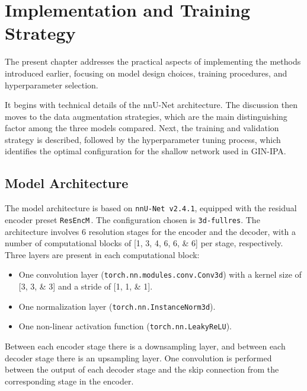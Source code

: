 \chapter{Implementation and Training Strategy} \label{chap:ImplementationAndTrainingStrategy}
\vspace{1cm}

The present chapter addresses the practical aspects of implementing the methods introduced earlier, focusing on model design choices, training procedures, and hyperparameter selection.

It begins with technical details of the nnU-Net architecture. The discussion then moves to the data augmentation strategies, which are the main distinguishing factor among the three models compared. Next, the training and validation strategy is described, followed by the hyperparameter tuning process, which identifies the optimal configuration for the shallow network used in GIN-IPA.

\section{Model Architecture} \label{sec:ModelArchitecture}
The model architecture is based on \texttt{nnU-Net v2.4.1}, equipped with the residual encoder preset \texttt{ResEncM}\,\cite{Isensee2024}. The configuration chosen is \texttt{3d-fullres}. The architecture involves \num{6} resolution stages for the encoder and the decoder, with a number of computational blocks of [\numlist[list-final-separator = {, }]{1;3;4;6;6;6}] per stage, respectively. Three layers are present in each computational block:
\begin{itemize}
    \item One convolution layer (\texttt{torch.nn.modules.conv.Conv3d}) with a kernel size of [\numlist[list-final-separator = {, }]{3;3;3}] and a stride of [\numlist[list-final-separator = {, }]{1;1;1}].
    \item One normalization layer (\texttt{torch.nn.InstanceNorm3d}).
    \item One non-linear activation function (\texttt{torch.nn.LeakyReLU}).
\end{itemize}
Between each encoder stage there is a downsampling layer, and between each decoder stage there is an upsampling layer. One convolution is performed between the output of each decoder stage and the skip connection from the corresponding stage in the encoder.

